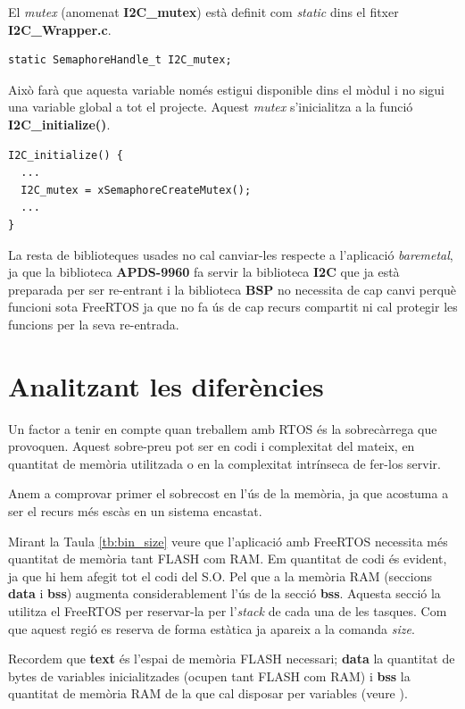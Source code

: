 El {\em mutex} (anomenat {\bf I2C\_mutex}) està definit com {\em static} dins el fitxer {\bf I2C\_Wrapper.c}.

\begin{lstlisting}[style=customc,label=I2CMutex]
static SemaphoreHandle_t I2C_mutex;
\end{lstlisting}

Això farà que aquesta variable només estigui disponible dins el mòdul i no sigui una variable global a tot el projecte. Aquest {\em mutex} s'inicialitza a la funció {\bf I2C\_initialize()}.

\begin{lstlisting}[style=customc,label=CreateI2CMutex]
I2C_initialize() {
  ...
  I2C_mutex = xSemaphoreCreateMutex();
  ...
}
\end{lstlisting}

La resta de biblioteques usades no cal canviar-les respecte a l'aplicació {\em baremetal}, ja que la biblioteca {\bf APDS-9960} fa servir la biblioteca {\bf I2C} que ja està preparada per ser re-entrant i la biblioteca {\bf BSP} no necessita de cap canvi perquè funcioni sota FreeRTOS ja que no fa ús de cap recurs compartit ni cal protegir les funcions per la seva re-entrada.

\section{Analitzant les diferències}
Un factor a tenir en compte quan treballem amb \gls{RTOS} és la sobrecàrrega que provoquen. Aquest sobre-preu pot ser en codi i complexitat del mateix, en quantitat de memòria utilitzada o en la complexitat intrínseca de fer-los servir.

Anem a comprovar primer el sobrecost en l'ús de la memòria, ja que acostuma a ser el recurs més escàs en un sistema encastat.

Mirant la Taula \ref{tb:bin_size} veure que l'aplicació amb FreeRTOS necessita més quantitat de memòria tant FLASH com RAM. Em quantitat de codi és evident, ja que hi hem afegit tot el codi del S.O. Pel que a la memòria RAM (seccions {\bf data} i {\bf bss}) augmenta considerablement l'ús de la secció {\bf bss}. Aquesta secció la utilitza el FreeRTOS per reservar-la per l'{\em stack} de cada una de les tasques. Com que aquest regió es reserva de forma estàtica ja apareix a la comanda {\em size}.

\begin{remark}
 Recordem que {\bf text} és l'espai de memòria FLASH necessari; {\bf data} la quantitat de bytes de variables inicialitzades (ocupen tant FLASH com RAM) i {\bf bss} la quantitat de memòria RAM de la que cal disposar per variables (veure ).
\end{remark}


